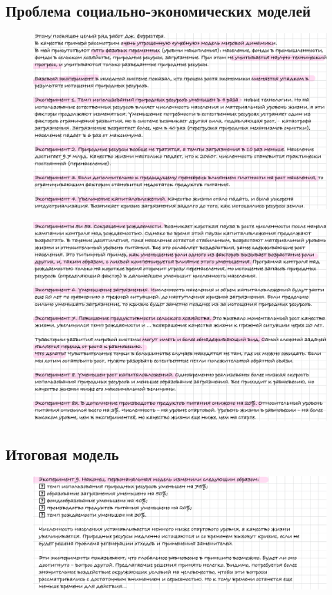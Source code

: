 	\subsection{Проблема социально-экономических моделей}
	\vspace{-1em}
	\begin{figure}[H]
		\centering
		\includegraphics[width=1\linewidth, height=0.35\textheight]{img/30_05}
		\label{fig:30_05}
	\end{figure}
	\vspace{-2em}
	\begin{figure}[H]
		\centering
		\includegraphics[width=1\linewidth, height=0.35\textheight]{img/30_06}
		\label{fig:30_06}
	\end{figure}
	\newpage
	\subsection{Итоговая модель}
	\vspace{-1em}
	\begin{figure}[H]
		\centering
		\includegraphics[width=1\linewidth, height=0.2\textheight]{img/30_07}
		\label{fig:30_07}
	\end{figure}
	

